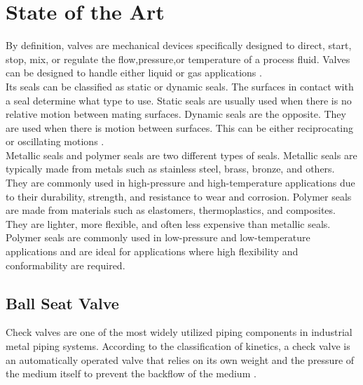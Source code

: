 \chapter{State of the Art}
\label{ch:State of the Art}


By definition, valves are mechanical devices specifically designed to direct, start, stop, mix,
 or regulate the flow,pressure,or temperature of a process fluid. 
 Valves can be designed to handle either liquid or gas applications \cite{skousen2011valve}. \\


 Its seals can be classified as static or dynamic seals. The surfaces in contact with a seal determine 
 what type to use. Static seals are usually used when there is no relative motion between mating surfaces.
  Dynamic seals are the opposite. They are used when there is motion between surfaces. 
 This can be either reciprocating or oscillating motions \cite{StaicOrDynamicSeals}. \\
 

 Metallic seals and polymer seals are two different types of seals. Metallic seals are 
 typically made from metals such as stainless steel, brass, bronze, and others.
 They are commonly used in high-pressure and high-temperature applications due to their durability,
  strength, and resistance to wear and corrosion. Polymer seals are made from materials such as elastomers, 
  thermoplastics, and composites. They are lighter, more flexible, and often less expensive than metallic seals.
  Polymer seals are commonly used in low-pressure and low-temperature applications and are ideal for
  applications where high flexibility and conformability are required. 



\section{Ball Seat Valve}
\label{Ball Seat Valve}

Check valves are one of the most widely utilized piping components in industrial metal piping systems. 
According to the classification of kinetics, a check valve is an automatically operated valve that
relies on its own weight and the pressure of the medium itself to prevent the backflow 
of the medium \cite{kineticsValve}. \\

